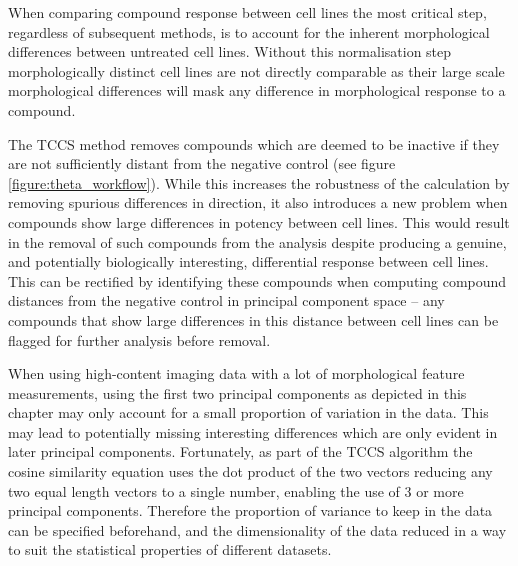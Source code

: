 \documentclass[a4paper,11pt,twoside,openright]{scrbook}
\begin{document}
When comparing compound response between cell lines the most critical step, regardless of subsequent methods, is to account for the inherent morphological differences between untreated cell lines.
Without this normalisation step morphologically distinct cell lines are not directly comparable as their large scale morphological differences will mask any difference in morphological response to a compound.

The TCCS method removes compounds which are deemed to be inactive if they are not sufficiently distant from the negative control (see figure \ref{figure:theta_workflow}).
While this increases the robustness of the calculation by removing spurious differences in direction, it also introduces a new problem when compounds show large differences in potency between cell lines.
This would result in the removal of such compounds from the analysis despite producing a genuine, and potentially biologically interesting, differential response between cell lines.
This can be rectified by identifying these compounds when computing compound distances from the negative control in principal component space -- any compounds that show large differences in this distance between cell lines can be flagged for further analysis before removal.


When using high-content imaging data with a lot of morphological feature measurements, using the first two principal components as depicted in this chapter may only account for a small proportion of variation in the data.
This may lead to potentially missing interesting differences which are only evident in later principal components.
Fortunately, as part of the TCCS algorithm the cosine similarity equation uses the dot product of the two vectors reducing any two equal length vectors to a single number, enabling the use of 3 or more principal components.
Therefore the proportion of variance to keep in the data can be specified beforehand, and the dimensionality of the data reduced in a way to suit the statistical properties of different datasets.
\end{document}
